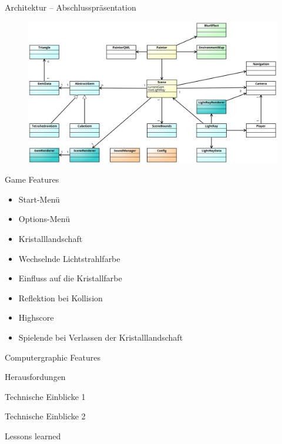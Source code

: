 \begin{frame}{Architektur -- Abschlusspräsentation}
	\begin{figure}
		\centering
		\includegraphics[width=\textwidth, height=0.7\textheight, keepaspectratio]{images/klassendiagramm-final}
	\end{figure}
\end{frame}

\begin{frame}{Game Features}
	\begin{itemize}
		\item Start-Menü
		\item Options-Menü
		\item Kristalllandschaft
		\item Wechselnde Lichtstrahlfarbe
		\item Einfluss auf die Kristallfarbe
		\item Reflektion bei Kollision
		\item Highscore
		\item Spielende bei Verlassen der Kristalllandschaft
	\end{itemize}
\end{frame}

\begin{frame}{Computergraphic Features}

\end{frame}

\begin{frame}{Herausfordungen}

\end{frame}

\begin{frame}{Technische Einblicke 1}

\end{frame}

\begin{frame}{Technische Einblicke 2}

\end{frame}

\begin{frame}{Lessons learned}

\end{frame}

%

